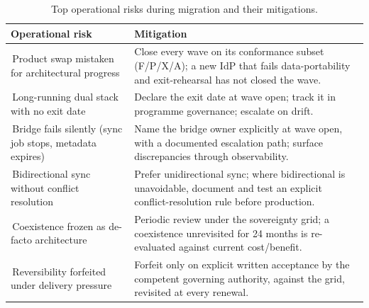 \documentclass[11pt,a4paper]{article}
\begin{document}
\begin{table}[h!]
\centering\small
\newcommand{\warn}{\textcolor{BrickRed}{\ding{72}}\,}%
\begin{tabularx}{\textwidth}{
  >{\raggedright\arraybackslash}p{4.4cm} X}
\toprule
\textbf{Operational risk} & \textbf{Mitigation} \\
\midrule
\warn Product swap mistaken for architectural progress &
  Close every wave on its conformance subset (F/P/X/A); a new IdP that fails
  data-portability and exit-rehearsal has not closed the wave. \\
\addlinespace
\warn Long-running dual stack with no exit date &
  Declare the exit date at wave open; track it in programme governance;
  escalate on drift. \\
\addlinespace
\warn Bridge fails silently (sync job stops, metadata expires) &
  Name the bridge owner explicitly at wave open, with a documented
  escalation path; surface discrepancies through observability. \\
\addlinespace
\warn Bidirectional sync without conflict resolution &
  Prefer unidirectional sync; where bidirectional is unavoidable, document
  and test an explicit conflict-resolution rule before production. \\
\addlinespace
\warn Coexistence frozen as de-facto architecture &
  Periodic review under the sovereignty grid; a coexistence unrevisited for
  24 months is re-evaluated against current cost/benefit. \\
\addlinespace
\warn Reversibility forfeited under delivery pressure &
  Forfeit only on explicit written acceptance by the competent governing
  authority, against the grid, revisited at every renewal. \\
\bottomrule
\end{tabularx}
\caption{Top operational risks during migration and their mitigations.}
\end{table}
\end{document}
